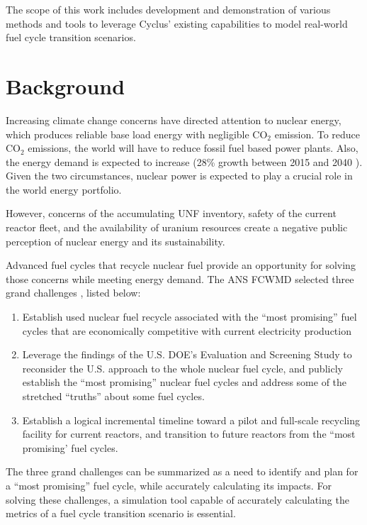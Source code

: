 The scope of this work includes development and demonstration of
various methods and tools to leverage Cyclus' existing
capabilities to model real-world fuel cycle transition scenarios.

\section{Background}
Increasing climate change concerns have directed attention
to nuclear energy, which produces reliable base load energy
with negligible CO$_2$ emission. To reduce CO$_2$ emissions,
the world will have to reduce fossil fuel based power plants.
Also, the energy demand is expected to increase
(28\% growth between 2015 and 2040 \cite{conti_international_2016}).
Given the two circumstances,
nuclear power is expected to play a crucial role in the world energy portfolio.

However, concerns of the accumulating \gls{UNF} inventory,
safety of the current reactor fleet, and the availability of
uranium resources create a negative public perception of
nuclear energy and its sustainability.

Advanced fuel cycles that recycle nuclear fuel 
provide an opportunity for solving those concerns while
meeting energy demand. The \gls{ANS} \gls{FCWMD} selected
three grand challenges \cite{huff_message_2017}, listed below:

\begin{enumerate}
	\item Establish used nuclear fuel recycle associated with the
	``most promising'' fuel cycles that are economically competitive
	with current electricity production
	\item Leverage the findings of the U.S. \gls{DOE}'s Evaluation
	and Screening Study to reconsider the U.S. approach to the whole
	nuclear fuel cycle, and publicly establish the ``most promising''
	nuclear fuel cycles and address some of the stretched ``truths''
	about some fuel cycles.
	\item Establish a logical incremental timeline toward a pilot
	and full-scale recycling facility for current reactors, and
	transition to future reactors from the ``most promising' fuel cycles.
\end{enumerate}

The three grand challenges can be summarized as a need to
identify and plan for a ``most promising'' fuel cycle, while
accurately calculating its impacts. For solving these challenges, a
simulation tool capable of accurately calculating the metrics
of a fuel cycle transition scenario is essential.


